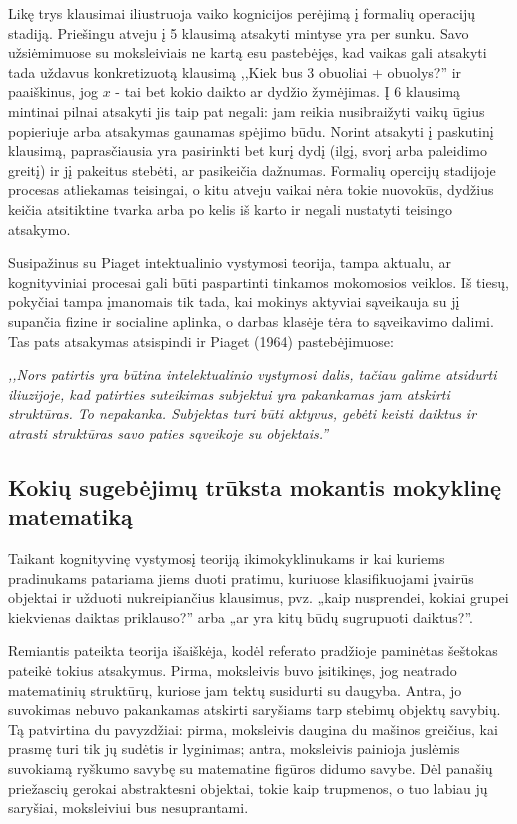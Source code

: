 \documentclass{article}
\begin{document}
Likę trys klausimai iliustruoja vaiko kognicijos perėjimą į formalių operacijų stadiją. Priešingu atveju į 5 klausimą atsakyti mintyse yra per sunku. Savo užsiėmimuose su moksleiviais ne kartą esu pastebėjęs, kad vaikas gali atsakyti tada uždavus konkretizuotą klausimą ,,Kiek bus 3 obuoliai + obuolys?'' ir paaiškinus, jog $x$ - tai bet kokio daikto ar dydžio žymėjimas. Į 6 klausimą mintinai pilnai atsakyti jis taip pat negali: jam reikia nusibraižyti vaikų ūgius popieriuje arba atsakymas gaunamas spėjimo būdu. Norint atsakyti į paskutinį klausimą, paprasčiausia yra pasirinkti bet kurį dydį (ilgį, svorį arba paleidimo greitį) ir jį pakeitus stebėti, ar pasikeičia dažnumas. Formalių opercijų stadijoje procesas atliekamas teisingai, o kitu atveju vaikai nėra tokie nuovokūs, dydžius keičia atsitiktine tvarka arba po kelis iš karto ir negali nustatyti teisingo atsakymo. 

Susipažinus su Piaget intektualinio vystymosi teorija, tampa aktualu, ar kognityviniai procesai gali būti paspartinti tinkamos mokomosios veiklos. Iš tiesų, pokyčiai tampa įmanomais tik tada, kai mokinys aktyviai sąveikauja su jį supančia fizine ir socialine aplinka, o darbas klasėje tėra to sąveikavimo dalimi. Tas pats atsakymas atsispindi ir Piaget (1964) pastebėjimuose: 

\textit{,,Nors patirtis yra būtina intelektualinio vystymosi dalis, tačiau galime atsidurti iliuzijoje, kad patirties suteikimas subjektui yra pakankamas jam atskirti struktūras. To nepakanka. Subjektas turi būti aktyvus, gebėti keisti daiktus ir atrasti struktūras savo paties sąveikoje su objektais.''}

\subsection{Kokių sugebėjimų trūksta mokantis mokyklinę matematiką}

Taikant kognityvinę vystymosį teoriją ikimokyklinukams ir kai kuriems pradinukams patariama jiems duoti pratimu, kuriuose
klasifikuojami įvairūs objektai ir užduoti nukreipiančius klausimus, pvz. „kaip nusprendei, kokiai grupei
kiekvienas daiktas priklauso?” arba „ar yra kitų būdų sugrupuoti daiktus?”. 

Remiantis pateikta teorija išaiškėja, kodėl referato pradžioje paminėtas šeštokas pateikė tokius atsakymus. Pirma, moksleivis buvo įsitikinęs, jog neatrado matematinių struktūrų, kuriose jam tektų susidurti su daugyba. Antra, jo suvokimas nebuvo pakankamas atskirti saryšiams tarp stebimų objektų savybių. Tą patvirtina du pavyzdžiai: pirma, moksleivis daugina du mašinos greičius, kai prasmę turi tik jų sudėtis ir lyginimas; antra, moksleivis painioja juslėmis suvokiamą ryškumo savybę su matematine figūros didumo savybe. Dėl panašių priežascių gerokai abstraktesni objektai, tokie kaip trupmenos, o tuo labiau jų
saryšiai, moksleiviui bus nesuprantami. 
\end{document}
